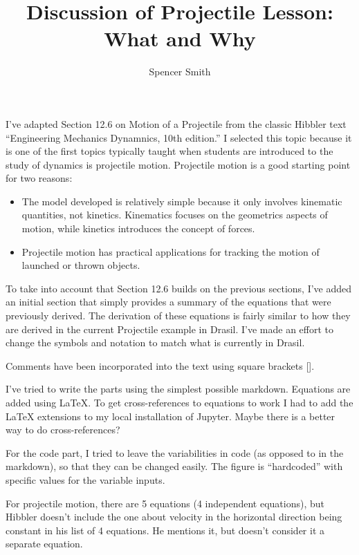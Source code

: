 \documentclass[12pt]{article}
\title{Discussion of Projectile Lesson: What and Why}
\author{Spencer Smith}
\begin{document}
\maketitle

I've adapted Section 12.6 on Motion of a Projectile from the classic Hibbler
text ``Engineering Mechanics Dynamnics, 10th edition.''  I selected this topic
because it is one of the first topics typically taught when students are
introduced to the study of dynamics is projectile motion.  Projectile motion is
a good starting point for two reasons:

\begin{itemize}

\item The model developed is relatively simple because it only involves kinematic
quantities, not kinetics.  Kinematics focuses on the geometrics aspects of
motion, while kinetics introduces the concept of forces.  

\item Projectile motion has practical applications for tracking the motion of
launched or thrown objects.

\end{itemize}

To take into account that Section 12.6 builds on the
previous sections, I've added an initial section that simply provides a summary
of the equations that were previously derived.  The derivation of these
equations is fairly similar to how they are derived in the current Projectile
example in Drasil.  I've made an effort to change the symbols and notation to
match what is currently in Drasil.  

Comments have been incorporated into the text using square brackets [].

I've tried to write the parts using the simplest possible markdown.  Equations
are added using LaTeX.  To get cross-references to equations to work I had to
add the LaTeX extensions to my local installation of Jupyter.  Maybe there is a
better way to do cross-references?

For the code part, I tried to leave the variabilities in code (as opposed to in
the markdown), so that they can be changed easily.  The figure is ``hardcoded''
with specific values for the variable inputs.

For projectile motion, there are 5 equations (4 independent equations), but
Hibbler doesn't include the one about velocity in the horizontal direction being
constant in his list of 4 equations.  He mentions it, but doesn't consider it a
separate equation.
\end{document}
